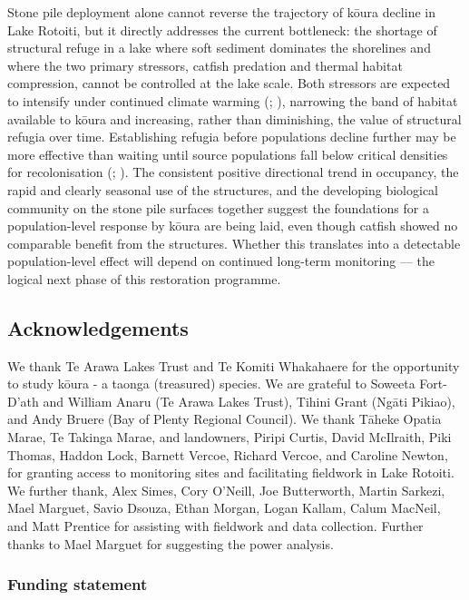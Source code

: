 \documentclass[
  letterpaper,
  DIV=11,
  numbers=noendperiod]{scrartcl}
\begin{document}
Stone pile deployment alone cannot reverse the trajectory of kōura
decline in Lake Rotoiti, but it directly addresses the current
bottleneck: the shortage of structural refuge in a lake where soft
sediment dominates the shorelines and where the two primary stressors,
catfish predation and thermal habitat compression, cannot be controlled
at the lake scale. Both stressors are expected to intensify under
continued climate warming (; ), narrowing the band of
habitat available to kōura and increasing, rather than diminishing, the
value of structural refugia over time. Establishing refugia before
populations decline further may be more effective than waiting until
source populations fall below critical densities for recolonisation
(;
). The consistent positive
directional trend in occupancy, the rapid and clearly seasonal use of
the structures, and the developing biological community on the stone
pile surfaces together suggest the foundations for a population-level
response by kōura are being laid, even though catfish showed no
comparable benefit from the structures. Whether this translates into a
detectable population-level effect will depend on continued long-term
monitoring --- the logical next phase of this restoration programme.

\subsection{Acknowledgements}\label{acknowledgements}

We thank Te Arawa Lakes Trust and Te Komiti Whakahaere for the
opportunity to study kōura - a taonga (treasured) species. We are
grateful to Soweeta Fort-D'ath and William Anaru (Te Arawa Lakes Trust),
Tihini Grant (Ngāti Pikiao), and Andy Bruere (Bay of Plenty Regional
Council). We thank Tāheke Opatia Marae, Te Takinga Marae, and
landowners, Piripi Curtis, David McIlraith, Piki Thomas, Haddon Lock,
Barnett Vercoe, Richard Vercoe, and Caroline Newton, for granting access
to monitoring sites and facilitating fieldwork in Lake Rotoiti. We
further thank, Alex Simes, Cory O'Neill, Joe Butterworth, Martin
Sarkezi, Mael Marguet, Savio Dsouza, Ethan Morgan, Logan Kallam, Calum
MacNeil, and Matt Prentice for assisting with fieldwork and data
collection. Further thanks to Mael Marguet for suggesting the power
analysis.

\subsubsection{Funding statement}\label{funding-statement}
\end{document}
